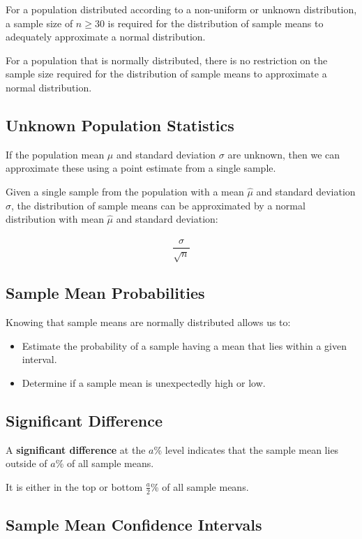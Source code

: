 \documentclass[a4paper,11pt]{report}
\begin{document}
For a population distributed according to a non-uniform or unknown distribution,
a sample size of $n \geq 30$ is required for the distribution of sample means to
adequately approximate a normal distribution.

For a population that is normally distributed, there is no restriction on the
sample size required for the distribution of sample means to approximate a
normal distribution.

\subsection{Unknown Population Statistics}

If the population mean $\mu$ and standard deviation $\sigma$ are unknown, then
we can approximate these using a point estimate from a single sample.

Given a single sample from the population with a mean $\hat{\mu}$ and standard
deviation $\hat{\sigma}$, the distribution of sample means can be approximated
by a normal distribution with mean $\hat{\mu}$ and standard deviation:

$$
\frac{\hat{\sigma}}{\sqrt{n}}
$$

\subsection{Sample Mean Probabilities}

Knowing that sample means are normally distributed allows us to:

\begin{itemize}
\item Estimate the probability of a sample having a mean that lies within a
	given interval.
\item Determine if a sample mean is unexpectedly high or low.
\end{itemize}

\subsection{Significant Difference}

A \textbf{significant difference} at the $a$\% level indicates that the sample
mean lies outside of $a$\% of all sample means.

It is either in the top or bottom $\frac{a}{2}$\% of all sample means.

\subsection{Sample Mean Confidence Intervals}
\end{document}

